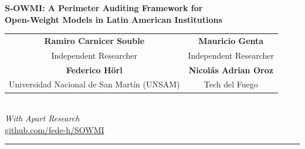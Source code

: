 \documentclass[11pt,a4paper]{article}
\begin{document}
\begin{center}
  {\LARGE\bfseries S-OWMI: A Perimeter Auditing Framework for\\[4pt]
    Open-Weight Models in Latin American Institutions}\\[1.2em]
  {\normalsize
    \begin{tabular}{cc}
      \textbf{Ramiro Carnicer Souble} & \textbf{Mauricio Genta} \\
      Independent Researcher & Independent Researcher \\[0.6em]
      \textbf{Federico Hörl} & \textbf{Nicolás Adrian Oroz} \\
      Universidad Nacional de San Martín (UNSAM) & Tech del Fuego \\
    \end{tabular}\\[0.6em]
    \textit{With Apart Research}\\[0.5em]
    \href{https://github.com/fede-h/SOWMI}{github.com/fede-h/SOWMI}
  }
\end{center}

\vspace{0.5em}
\hrule
\vspace{0.8em}
\end{document}
